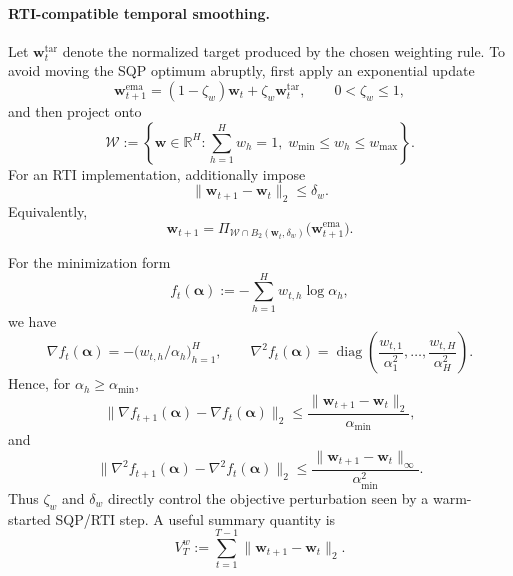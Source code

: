 \documentclass[11pt]{article}
\newcommand{\RR}{\mathbb{R}}
\begin{document}
\paragraph{RTI-compatible temporal smoothing.}
Let $\bm w_t^{\mathrm{tar}}$ denote the normalized target produced by the
chosen weighting rule.  To avoid moving the SQP optimum abruptly, first apply
an exponential update
\begin{equation}
    \bm w_{t+1}^{\mathrm{ema}}
    =
    (1-\zeta_w)\bm w_t
    +
    \zeta_w\bm w_t^{\mathrm{tar}},
    \qquad
    0<\zeta_w\le1,
    \label{eq:weight-ema}
\end{equation}
and then project onto
\begin{equation}
    \mathcal W
    :=
    \left\{
        \bm w\in\RR^H:
        \sum_{h=1}^H w_h=1,\;
        w_{\min}\le w_h\le w_{\max}
    \right\}.
    \label{eq:admissible-weight-set}
\end{equation}
For an RTI implementation, additionally impose
\begin{equation}
    \|\bm w_{t+1}-\bm w_t\|_2\le\delta_w.
    \label{eq:weight-step-limit}
\end{equation}
Equivalently,
\begin{equation}
\boxed{
    \bm w_{t+1}
    =
    \Pi_{\mathcal W\cap B_2(\bm w_t,\delta_w)}
    \bigl(\bm w_{t+1}^{\mathrm{ema}}\bigr).
}
\label{eq:rti-compatible-weight-update}
\end{equation}

For the minimization form
\[
    f_t(\bm\alpha)
    :=
    -\sum_{h=1}^H w_{t,h}\log\alpha_h,
\]
we have
\[
    \nabla f_t(\bm\alpha)
    =
    -\bigl(w_{t,h}/\alpha_h\bigr)_{h=1}^H,
    \qquad
    \nabla^2 f_t(\bm\alpha)
    =
    \operatorname{diag}\!\left(
        \frac{w_{t,1}}{\alpha_1^2},\ldots,
        \frac{w_{t,H}}{\alpha_H^2}
    \right).
\]
Hence, for $\alpha_h\ge\alpha_{\min}$,
\begin{equation}
    \|\nabla f_{t+1}(\bm\alpha)-\nabla f_t(\bm\alpha)\|_2
    \le
    \frac{\|\bm w_{t+1}-\bm w_t\|_2}{\alpha_{\min}},
    \label{eq:gradient-weight-perturbation}
\end{equation}
and
\begin{equation}
    \|\nabla^2 f_{t+1}(\bm\alpha)-\nabla^2 f_t(\bm\alpha)\|_2
    \le
    \frac{\|\bm w_{t+1}-\bm w_t\|_\infty}{\alpha_{\min}^2}.
    \label{eq:hessian-weight-perturbation}
\end{equation}
Thus $\zeta_w$ and $\delta_w$ directly control the objective perturbation seen
by a warm-started SQP/RTI step.  A useful summary quantity is
\[
    V_T^w
    :=
    \sum_{t=1}^{T-1}\|\bm w_{t+1}-\bm w_t\|_2.
\]
\end{document}

